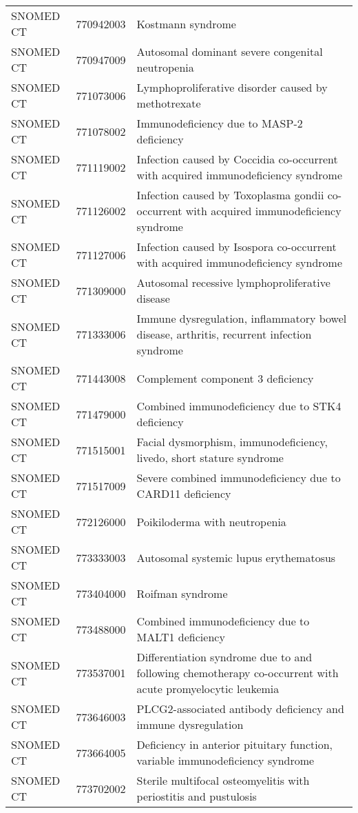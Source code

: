 \begin{table}[ht]
\begin{tabular}{lll}
  SNOMED CT & 770942003 & Kostmann syndrome \\ 
  SNOMED CT & 770947009 & Autosomal dominant severe congenital neutropenia \\ 
  SNOMED CT & 771073006 & Lymphoproliferative disorder caused by methotrexate \\ 
  SNOMED CT & 771078002 & Immunodeficiency due to MASP-2 deficiency \\ 
  SNOMED CT & 771119002 & Infection caused by Coccidia co-occurrent with acquired immunodeficiency syndrome \\ 
  SNOMED CT & 771126002 & Infection caused by Toxoplasma gondii co-occurrent with acquired immunodeficiency syndrome \\ 
  SNOMED CT & 771127006 & Infection caused by Isospora co-occurrent with acquired immunodeficiency syndrome \\ 
  SNOMED CT & 771309000 & Autosomal recessive lymphoproliferative disease \\ 
  SNOMED CT & 771333006 & Immune dysregulation, inflammatory bowel disease, arthritis, recurrent infection syndrome \\ 
  SNOMED CT & 771443008 & Complement component 3 deficiency \\ 
  SNOMED CT & 771479000 & Combined immunodeficiency due to STK4 deficiency \\ 
  SNOMED CT & 771515001 & Facial dysmorphism, immunodeficiency, livedo, short stature syndrome \\ 
  SNOMED CT & 771517009 & Severe combined immunodeficiency due to CARD11 deficiency \\ 
  SNOMED CT & 772126000 & Poikiloderma with neutropenia \\ 
  SNOMED CT & 773333003 & Autosomal systemic lupus erythematosus \\ 
  SNOMED CT & 773404000 & Roifman syndrome \\ 
  SNOMED CT & 773488000 & Combined immunodeficiency due to MALT1 deficiency \\ 
  SNOMED CT & 773537001 & Differentiation syndrome due to and following chemotherapy co-occurrent with acute promyelocytic leukemia \\ 
  SNOMED CT & 773646003 & PLCG2-associated antibody deficiency and immune dysregulation \\ 
  SNOMED CT & 773664005 & Deficiency in anterior pituitary function, variable immunodeficiency syndrome \\ 
  SNOMED CT & 773702002 & Sterile multifocal osteomyelitis with periostitis and pustulosis \\ 

\end{tabular}
\end{table}
